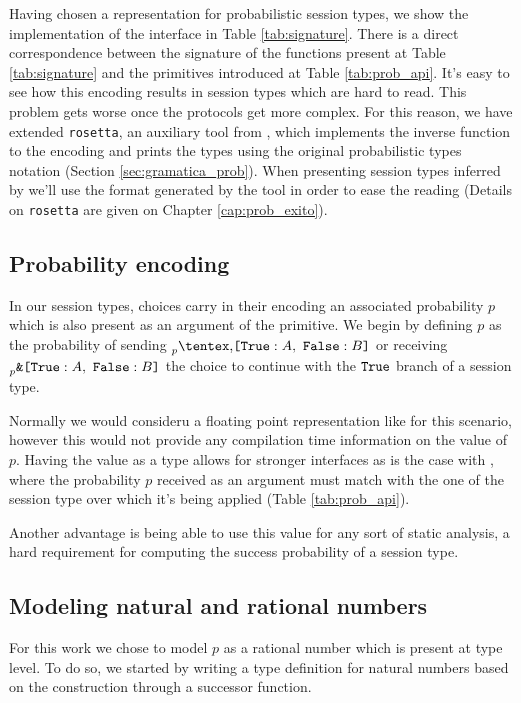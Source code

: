 Having chosen a representation for probabilistic session types, we show the
implementation of the \OCaml interface in Table \ref{tab:signature}. There is a
direct correspondence between the signature of the functions present at Table
\ref{tab:signature} and the primitives introduced at Table \ref{tab:prob_api}.
It's easy to see how this encoding results in session types which are hard to
read. This problem gets worse once the protocols get more complex. For this
reason, we have extended \texttt{rosetta}, an auxiliary tool from \FuSe, which
implements the inverse function to the encoding and prints the types using the
original probabilistic types notation (Section \ref{sec:gramatica_prob}). When
presenting session types inferred by \OCaml we'll use the format generated by
the tool in order to ease the reading (Details on \texttt{rosetta} are given on
Chapter \ref{cap:prob_exito}).

\subsection{Probability encoding}

In our session types, choices carry in their encoding an associated probability
$p$ which is also present as an argument of the  primitive. We begin by
defining $p$ as the probability of sending $\BinaryPChoice{\etvar}{\etvarB}$ or
receiving $\BinaryPBranch{\etvar}{\etvarB}$ the choice to continue with the
$\Tag[True]$ branch of a session type.

Normally we would consideru a floating point representation like \tfloat for
this scenario, however this would not provide any compilation time information
on the value of $p$. Having the value as a type allows for stronger interfaces
as is the case with , where the probability $p$ received as an argument
must match with the one of the session type over which it's being applied (Table
\ref{tab:prob_api}).

Another advantage is being able to use this value for any sort of static
analysis, a hard requirement for computing the success probability of a session
type.

\subsection{Modeling natural and rational numbers}

For this work we chose to model $p$ as a rational number which is present at
type level. To do so, we started by writing a type definition for natural
numbers based on the construction through a successor function.

